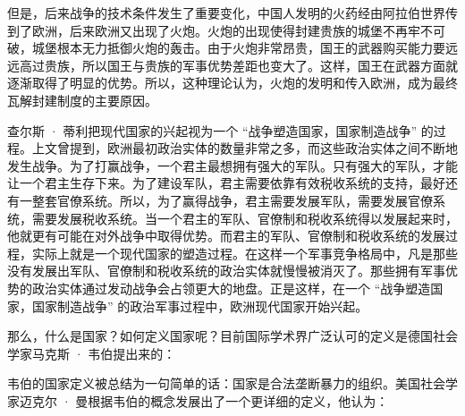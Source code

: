 但是，后来战争的技术条件发生了重要变化，中国人发明的火药经由阿拉伯世界传到了欧洲，后来欧洲又出现了火炮。火炮的出现使得封建贵族的城堡不再牢不可破，城堡根本无力抵御火炮的轰击。由于火炮非常昂贵，国王的武器购买能力要远远高过贵族，所以国王与贵族的军事优势差距也变大了。这样，国王在武器方面就逐渐取得了明显的优势。所以，这种理论认为，火炮的发明和传入欧洲，成为最终瓦解封建制度的主要原因。

查尔斯 · 蒂利把现代国家的兴起视为一个 “战争塑造国家，国家制造战争” 的过程。上文曾提到，欧洲最初政治实体的数量非常之多，而这些政治实体之间不断地发生战争。为了打赢战争，一个君主最想拥有强大的军队。只有强大的军队，才能让一个君主生存下来。为了建设军队，君主需要依靠有效税收系统的支持，最好还有一整套官僚系统。所以，为了赢得战争，君主需要发展军队，需要发展官僚系统，需要发展税收系统。当一个君主的军队、官僚制和税收系统得以发展起来时，他就更有可能在对外战争中取得优势。而君主的军队、官僚制和税收系统的发展过程，实际上就是一个现代国家的塑造过程。在这样一个军事竞争格局中，凡是那些没有发展出军队、官僚制和税收系统的政治实体就慢慢被消灭了。那些拥有军事优势的政治实体通过发动战争会占领更大的地盘。正是这样，在一个 “战争塑造国家，国家制造战争” 的政治军事过程中，欧洲现代国家开始兴起。


那么，什么是国家？如何定义国家呢？目前国际学术界广泛认可的定义是德国社会学家马克斯 · 韦伯提出来的：


韦伯的国家定义被总结为一句简单的话：国家是合法垄断暴力的组织。美国社会学家迈克尔 · 曼根据韦伯的概念发展出了一个更详细的定义，他认为：


